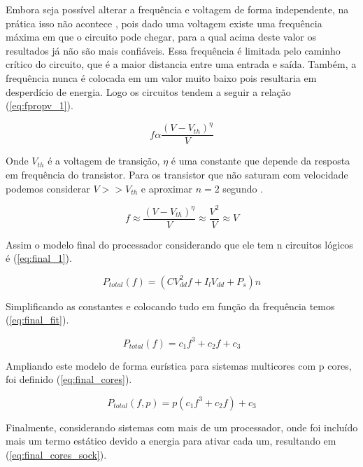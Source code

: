 Embora seja possível alterar a frequência e voltagem de forma independente, na prática isso não acontece \cite{Usman2013}, pois dado uma voltagem existe uma frequência máxima em que o circuito pode chegar, para a qual acima deste valor os resultados já não são mais confiáveis. Essa frequência é limitada pelo caminho crítico do circuito, que é a maior distancia entre uma entrada e saída. Também, a frequência nunca é colocada em um valor muito baixo pois resultaria em desperdício de energia. Logo os circuitos tendem a seguir a relação (\ref{eq:fpropv_1}).

\begin{equation}
f \alpha \frac{(V-V_{th})^{\eta}}{V} \label{eq:fpropv_1}
\end{equation}

Onde $V_{th}$ é a voltagem de transição, $\eta$ é uma constante que depende da resposta em frequência do transistor. Para os transistor que não saturam com velocidade podemos considerar $V>>V_{th}$ e aproximar $n=2$ segundo \cite{Gonzalez1997}.

\begin{equation}
f \approx \frac{(V-V_{th})^{\eta}}{V} \approx \frac{V^2}{V} \approx V  \label{eq:fpropv_2}
\end{equation}

Assim o modelo final do processador considerando que ele tem n circuitos lógicos é (\ref{eq:final_1}).

\begin{equation}
P_{total}(f)= (CV_{dd}^2f+I_lV_{dd}+P_s)n \label{eq:final_1}
\end{equation}

Simplificando as constantes e colocando tudo em função da frequência temos (\ref{eq:final_fit}).

\begin{equation}
P_{total}(f)= c_1f^3+c_2f+c_3 \label{eq:final_fit}
\end{equation}

Ampliando este modelo de forma eurística para sistemas multicores com p cores, foi definido (\ref{eq:final_cores}).

\begin{equation}
P_{total}(f,p)= p(c_1f^3+c_2f)+c_3 \label{eq:final_cores}
\end{equation}

Finalmente, considerando sistemas com mais de um processador, onde foi incluído mais um termo estático devido a energia para ativar cada um, resultando em (\ref{eq:final_cores_sock}).

